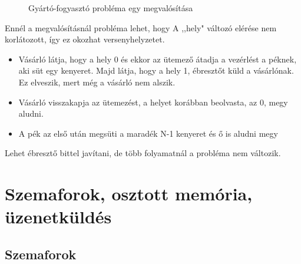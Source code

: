 \documentclass[margin=0px]{article}
\begin{document}
\begin{itemize}
\begin{figure}[H]
			\caption{Gyártó-fogyasztó probléma egy megvalósítása}
		\end{figure}
		Ennél a megvalósításnál probléma lehet, hogy A ,,hely" változó elérése nem korlátozott, így ez okozhat versenyhelyzetet.
		\begin{itemize}
			\item Vásárló látja, hogy a hely 0 és ekkor az ütemező átadja a vezérlést a péknek, aki süt egy kenyeret. Majd látja, hogy a hely 1, ébresztőt küld a vásárlónak. Ez elveszik, mert még a vásárló nem alszik.
			\item Vásárló visszakapja az ütemezést, a helyet korábban beolvasta, az 0, megy aludni.
			\item A pék az első után megsüti a maradék N-1 kenyeret és ő is aludni megy
		\end{itemize}
		Lehet ébresztő bittel javítani, de több folyamatnál a probléma nem változik.
	\end{itemize}
	
	\section{Szemaforok, osztott memória, üzenetküldés}
	
	\subsection{Szemaforok}
	
\end{document}
